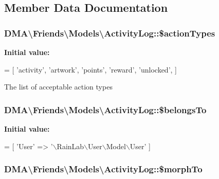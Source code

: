 \subsection{Member Data Documentation}
\hypertarget{classDMA_1_1Friends_1_1Models_1_1ActivityLog_aa60b5fe0e1e7c254827bfa35c69aef9d}{
\subsubsection[{\$action\-Types}]{\setlength{\rightskip}{0pt plus 5cm}D\-M\-A\textbackslash{}\-Friends\textbackslash{}\-Models\textbackslash{}\-Activity\-Log\-::\$action\-Types}}\label{classDMA_1_1Friends_1_1Models_1_1ActivityLog_aa60b5fe0e1e7c254827bfa35c69aef9d}
{\bfseries Initial value\-:}
\begin{DoxyCode}
= [
        \textcolor{stringliteral}{'activity'},
        \textcolor{stringliteral}{'artwork'},
        \textcolor{stringliteral}{'points'},
        \textcolor{stringliteral}{'reward'},
        \textcolor{stringliteral}{'unlocked'},
    ]
\end{DoxyCode}
The list of acceptable action types \hypertarget{classDMA_1_1Friends_1_1Models_1_1ActivityLog_aff637d41ffa73260e1ffc1788f5a98d7}{
\subsubsection[{\$belongs\-To}]{\setlength{\rightskip}{0pt plus 5cm}D\-M\-A\textbackslash{}\-Friends\textbackslash{}\-Models\textbackslash{}\-Activity\-Log\-::\$belongs\-To}}\label{classDMA_1_1Friends_1_1Models_1_1ActivityLog_aff637d41ffa73260e1ffc1788f5a98d7}
{\bfseries Initial value\-:}
\begin{DoxyCode}
= [
        \textcolor{stringliteral}{'User'} => \textcolor{stringliteral}{'\(\backslash\)RainLab\(\backslash\)User\(\backslash\)Model\(\backslash\)User'}
    ]
\end{DoxyCode}
\hypertarget{classDMA_1_1Friends_1_1Models_1_1ActivityLog_afaa82849e3e93bf41ac948658ac652ff}{
\subsubsection[{\$morph\-To}]{\setlength{\rightskip}{0pt plus 5cm}D\-M\-A\textbackslash{}\-Friends\textbackslash{}\-Models\textbackslash{}\-Activity\-Log\-::\$morph\-To}}\label{classDMA_1_1Friends_1_1Models_1_1ActivityLog_afaa82849e3e93bf41ac948658ac652ff}
